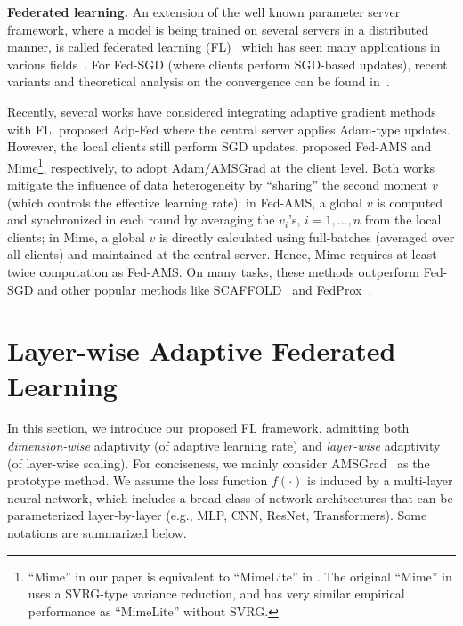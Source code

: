 \documentclass[nohyperref]{article}
\theoremstyle{plain}
\theoremstyle{definition}
\theoremstyle{remark}
\begin{document}
\noindent\textbf{Federated learning.}
An extension of the well known parameter server framework, where a model is being trained on several servers in a distributed manner, is called federated learning (FL)~\cite{konevcny2016federated,mcmahan2017communication} which has seen many applications in various fields~\cite{Article:YangLCT19,Proc:Leroy_ICASSP19,bonawitz2019towards,Article:NiknamDR20,Proc:XuGSWBW21}. For Fed-SGD (where clients perform SGD-based updates), recent variants and theoretical analysis on the convergence can be found in~\citet{Proc:YuJY_ICML19,karimireddy2019scaffold,Proc:Khaled_AISTATS20,Proc:Li_ICLR20,Proc:Woodworth_ICML20,Proc:WangTBR_ICLR20}.

Recently, several works have considered integrating adaptive gradient methods with FL. \citet{reddi2020adaptive} proposed Adp-Fed where the central server applies Adam-type updates. However, the local clients still perform SGD updates. \citet{chen2020toward,karimireddy2020mime} proposed Fed-AMS and Mime\footnote{``Mime'' in our paper is equivalent to ``MimeLite'' in \cite{karimireddy2020mime}. The original ``Mime'' in \cite{karimireddy2020mime} uses a SVRG-type variance reduction, and has very similar empirical performance as ``MimeLite'' without SVRG.}, respectively, to adopt Adam/AMSGrad at the client level. Both works mitigate the influence of data heterogeneity by ``sharing'' the second moment $v$ (which controls the effective learning rate): in Fed-AMS, a global $v$ is computed and synchronized in each round by averaging the $v_i$'s, $i=1,...,n$ from the local clients; in Mime, a global $v$ is directly calculated using full-batches (averaged over all clients) and maintained at the central server. Hence, Mime requires at least twice computation as Fed-AMS. On many tasks, these methods outperform Fed-SGD and other popular methods like SCAFFOLD~\cite{karimireddy2019scaffold} and FedProx~\cite{Article:Sahu_arxiv18}.



\section{Layer-wise Adaptive Federated Learning}\label{sec:main}

In this section, we introduce our proposed FL framework, admitting both \textit{dimension-wise} adaptivity (of adaptive learning rate) and \textit{layer-wise} adaptivity (of layer-wise scaling). For conciseness, we mainly consider AMSGrad~\cite{reddi2019convergence} as the prototype method. We assume the loss function $f(\cdot)$ is induced by a multi-layer neural network, which includes a broad class of network architectures that can be parameterized layer-by-layer (e.g., MLP, CNN, ResNet, Transformers). Some notations are summarized below.
\end{document}
